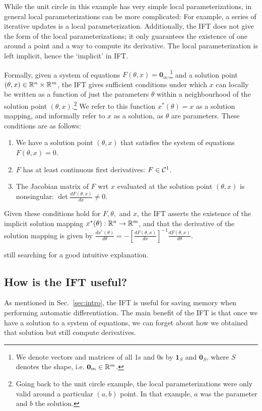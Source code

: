 \documentclass[11pt]{article}
\begin{document}
While the unit circle in this example has very simple local parameterizations,
in general local parameterizations can be more complicated: For example,
a series of iterative updates is a local parameterization.
Additionally, the IFT does not give the form of the local parameterizations;
it only guarantees the existence of one around a point and a way to compute its derivative.
The local parameterization is left implicit, hence the `implicit' in IFT.

Formally, given a system of equations $F(\theta, x) = \mathbf{0}_m$,\footnote{
We denote vectors and matrices of all 1s and 0s by $\mathbf{1}_S$
and $\mathbf{0}_S$, where $S$ denotes the shape, i.e. $\mathbf{0}_m\in\mathbb{R}^m$.
}
and a solution point $(\theta,x) \in \mathbb{R}^n\times\mathbb{R}^m$,
the IFT gives sufficient conditions under which $x$ can locally be written as a function
of just the parameters $\theta$ within a neighbourhood of the solution point $(\theta,x)$.\footnote{
Going back to the unit circle example, the local parameterizations were only valid around
a particular $(a,b)$ point.
In that example, $a$ was the parameter and $b$ the solution.
}
We refer to this function $x^*(\theta) = x$ as a solution mapping,
and informally refer to $x$ as a solution, as $\theta$ are parameters.
These conditions are as follows:
\begin{enumerate}
\item We have a solution point $(\theta, x)$ that satisfies the system of equations
    $F(\theta, x) = 0$.
\item $F$ has at least continuous first derivatives: $F \in \mathcal{C}^1$.
\item The Jacobian matrix of $F$ wrt $x$ evaluated at the solution point $(\theta,x)$ is nonsingular:
    $\det \frac{d F(\theta,x)}{d x} \neq 0$.
\end{enumerate}
Given these conditions hold for $F,\theta,$ and $x$, the IFT
asserts the existence of the implicit solution mapping $x^*(\theta):\mathbb{R}^n\to\mathbb{R}^m$,
and that the derivative of the solution mapping is given by
$\frac{d x^*(\theta)}{d\theta} = -[\frac{dF(\theta,x)}{dx}]^{-1}
    \frac{d F(\theta,x)}{d\theta}$.

{\color{red} still searching for a good intuitive explanation.}

\subsection{How is the IFT useful?}
As mentioned in Sec.~\ref{sec:intro}, the IFT is useful for saving memory when performing
automatic differentiation.
The main benefit of the IFT is that once we have a solution to a system of equations,
we can forget about how we obtained that solution but still compute derivatives.
\end{document}
